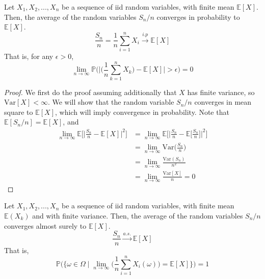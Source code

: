   \begin{theorem}
    Let $X_1, X_2, ..., X_n$ be a sequence of iid random variables, with finite mean $\mathbb{E}[X]$. Then, the average of the random variables $S_n / n$ converges in probability to $\mathbb{E}[X]$. 
    \begin{equation}
      \frac{S_n}{n} = \frac{1}{n} \sum_{i=1}^n X_i \xrightarrow{i.p} \mathbb{E}[X]
    \end{equation}
    That is, for any $\epsilon > 0$, 
    \begin{equation}
      \lim_{n \rightarrow \infty} \mathbb{P} \bigg( \bigg| \Big( \frac{1}{n} \sum_{k=1}^n X_k \Big) - \mathbb{E}[X] \bigg| > \epsilon \bigg) = 0
    \end{equation}
  \end{theorem}
  \begin{proof}
    We first do the proof assuming additionally that $X$ has finite variance, so $\mathrm{Var}[X] < \infty$. We will show that the random variable $S_n/n$ converges in mean square to $\mathbb{E}[X]$, which will imply convergence in probability. Note that $\mathbb{E}[S_n / n] = \mathbb{E}[X]$, and 
    \begin{align*}
      \lim_{n \rightarrow \infty} \mathbb{E} \bigg[ \bigg| \frac{S_n}{n} - \mathbb{E}[X] \bigg|^2 \bigg] & = \lim_{n \rightarrow \infty} \mathbb{E} \bigg[ \bigg| \frac{S_n}{n} - \mathbb{E}\Big[\frac{S_n}{n}\Big] \bigg|^2 \bigg] \\
      & = \lim_{n \rightarrow \infty} \mathrm{Var}\Big( \frac{S_n}{n} \Big) \\
      & = \lim_{n \rightarrow \infty} \frac{\mathrm{Var}(S_n)}{n^2} \\
      & = \lim_{n \rightarrow \infty} \frac{\mathrm{Var}[X]}{n} = 0
    \end{align*}
  \end{proof}

  \begin{theorem}
    Let $X_1, X_2, ..., X_n$ be a sequence of iid random variables, with finite mean $\mathbb{E}(X_k)$ and with finite variance. Then, the average of the random variables $S_n / n$ converges almost surely to $\mathbb{E}[X]$. 
    \begin{equation}
      \frac{S_n}{n} \xrightarrow{a.s.} \mathbb{E}[X]
    \end{equation}
    That is, 
    \begin{equation}
      \mathbb{P} \bigg( \Big\{ \omega \in \Omega \mid \lim_{n \rightarrow \infty} \Big( \frac{1}{n} \sum_{i=1}^n X_i (\omega) \Big) = \mathbb{E}[X] \Big\} \bigg) = 1
    \end{equation}
  \end{theorem}

